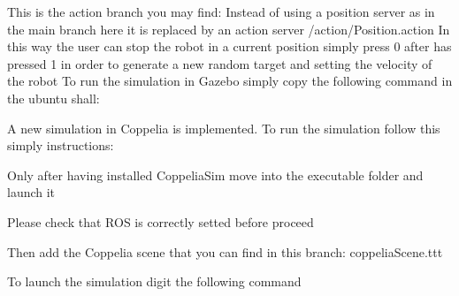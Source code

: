 This is the action branch you may find\+: Instead of using a position server as in the main branch here it is replaced by an action server /action/\+Position.action In this way the user can stop the robot in a current position simply press 0 after has pressed 1 in order to generate a new random target and setting the velocity of the robot To run the simulation in Gazebo simply copy the following command in the ubuntu shall\+: ~\newline
 
\begin{DoxyCode}{0}
\end{DoxyCode}
 \begin{DoxyVerb}A new simulation in Coppelia is implemented.
To run the simulation follow this simply instructions:
\end{DoxyVerb}
 
\begin{DoxyCode}{0}
\end{DoxyCode}
 \begin{DoxyVerb}Only after having installed CoppeliaSim move into the executable folder and launch it
\end{DoxyVerb}
 
\begin{DoxyCode}{0}
\end{DoxyCode}
 \begin{DoxyVerb}Please check that ROS is correctly setted before proceed

Then add the Coppelia scene that you can find in this branch:
coppeliaScene.ttt

To launch the simulation digit the following command
\end{DoxyVerb}



\begin{DoxyCode}{0}
\end{DoxyCode}
 